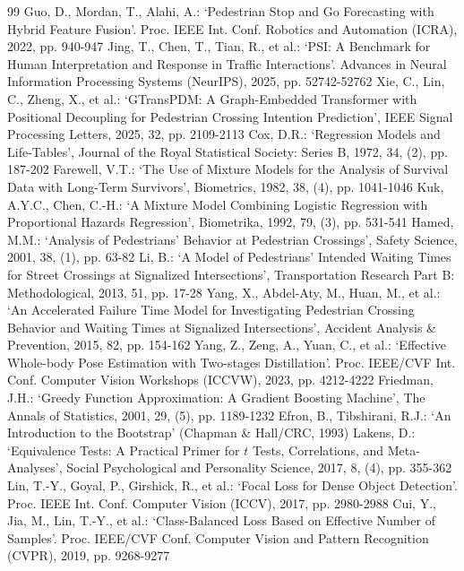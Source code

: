 \begin{thebibliography}{99}
 Guo, D., Mordan, T., Alahi, A.: `Pedestrian Stop and Go Forecasting with Hybrid Feature Fusion'. Proc. IEEE Int. Conf. Robotics and Automation (ICRA), 2022, pp. 940-947
 Jing, T., Chen, T., Tian, R., et al.: `PSI: A Benchmark for Human Interpretation and Response in Traffic Interactions'. Advances in Neural Information Processing Systems (NeurIPS), 2025, pp. 52742-52762
 Xie, C., Lin, C., Zheng, X., et al.: `GTransPDM: A Graph-Embedded Transformer with Positional Decoupling for Pedestrian Crossing Intention Prediction', IEEE Signal Processing Letters, 2025, 32, pp. 2109-2113
 Cox, D.R.: `Regression Models and Life-Tables', Journal of the Royal Statistical Society: Series B, 1972, 34, (2), pp. 187-202
 Farewell, V.T.: `The Use of Mixture Models for the Analysis of Survival Data with Long-Term Survivors', Biometrics, 1982, 38, (4), pp. 1041-1046
 Kuk, A.Y.C., Chen, C.-H.: `A Mixture Model Combining Logistic Regression with Proportional Hazards Regression', Biometrika, 1992, 79, (3), pp. 531-541
 Hamed, M.M.: `Analysis of Pedestrians' Behavior at Pedestrian Crossings', Safety Science, 2001, 38, (1), pp. 63-82
 Li, B.: `A Model of Pedestrians' Intended Waiting Times for Street Crossings at Signalized Intersections', Transportation Research Part B: Methodological, 2013, 51, pp. 17-28
 Yang, X., Abdel-Aty, M., Huan, M., et al.: `An Accelerated Failure Time Model for Investigating Pedestrian Crossing Behavior and Waiting Times at Signalized Intersections', Accident Analysis \& Prevention, 2015, 82, pp. 154-162
 Yang, Z., Zeng, A., Yuan, C., et al.: `Effective Whole-body Pose Estimation with Two-stages Distillation'. Proc. IEEE/CVF Int. Conf. Computer Vision Workshops (ICCVW), 2023, pp. 4212-4222
 Friedman, J.H.: `Greedy Function Approximation: A Gradient Boosting Machine', The Annals of Statistics, 2001, 29, (5), pp. 1189-1232
 Efron, B., Tibshirani, R.J.: `An Introduction to the Bootstrap' (Chapman \& Hall/CRC, 1993)
 Lakens, D.: `Equivalence Tests: A Practical Primer for $t$ Tests, Correlations, and Meta-Analyses', Social Psychological and Personality Science, 2017, 8, (4), pp. 355-362
 Lin, T.-Y., Goyal, P., Girshick, R., et al.: `Focal Loss for Dense Object Detection'. Proc. IEEE Int. Conf. Computer Vision (ICCV), 2017, pp. 2980-2988
 Cui, Y., Jia, M., Lin, T.-Y., et al.: `Class-Balanced Loss Based on Effective Number of Samples'. Proc. IEEE/CVF Conf. Computer Vision and Pattern Recognition (CVPR), 2019, pp. 9268-9277
\end{thebibliography}
